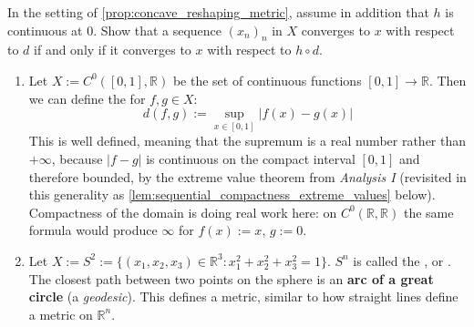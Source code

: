 \begin{exercise}
\label{ex:reshaping_same_convergence}
In the setting of \cref{prop:concave_reshaping_metric}, assume in addition that $h$ is continuous
at $0$. Show that a sequence $(x_n)_n$ in $X$ converges to $x$ with respect to $d$ if and only if
it converges to $x$ with respect to $h \circ d$.
\end{exercise}

\begin{example}[continued]
\begin{enumerate}[label=\textbf{(\alph*)}, start=3]
  \item Let $X := C^0([0,1], \mathbb{R})$ be the set of continuous functions $[0,1] \to \mathbb{R}$.
    Then we can define the  for $f, g \in X$:
    \[
    d(f,g) := \sup_{x \in [0,1]} |f(x) - g(x)|
    \]
    This is well defined, meaning that the supremum is a real number rather than $+\infty$, because
    $|f-g|$ is continuous on the compact interval $[0,1]$ and therefore bounded, by the extreme
    value theorem from \emph{Analysis I} (revisited in this generality as
    \cref{lem:sequential_compactness_extreme_values} below). Compactness of the domain is doing
    real work here: on $C^0(\mathbb{R},\mathbb{R})$ the same formula would produce $\infty$ for
    $f(x) := x$, $g := 0$.
  \item Let $X := S^2 := \{(x_1,x_2,x_3) \in \mathbb{R}^3 : x_1^2 + x_2^2 + x_3^2 = 1\}$. $S^n$ is
    called the , or . The closest path between
    two points on the sphere is an \textbf{arc of a great circle} (a \textit{geodesic}). This
    defines a metric, similar to how straight lines define a metric on $\mathbb{R}^n$.
\end{enumerate}
\end{example}

